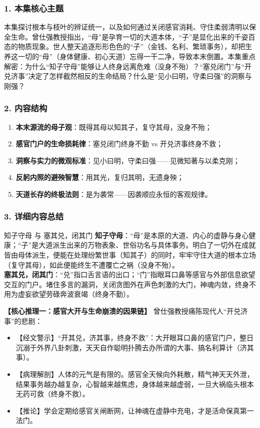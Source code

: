 \subsubsection{1. 本集核心主题}
本集探讨根本与枝叶的辨证统一，以及如何通过关闭感官消耗、守住柔弱清明以保全生命。曾仕强教授指出，“母”是孕育一切的大道本体，“子”是显化出来的千姿百态的物质现象。世人整天追逐形形色色的“子”（金钱、名利、繁琐事务），却把生养这一切的“母”（身体健康、初心天道）忘得一干二净，导致本末倒置。本集重点解密：为什么“知子守母”能够让人终身远离危难（没身不殆）？“塞兑闭门”与“开兑济事”决定了怎样截然相反的生命结局？什么是“见小曰明，守柔曰强”的洞察与刚强？

\subsubsection{2. 内容结构}
\begin{enumerate}
    \item \textbf{本末源流的母子观}：既得其母以知其子，复守其母，没身不殆；
    \item \textbf{感官门户的生命损耗律}：塞兑闭门终身不勤 vs 开兑济事终身不救；
    \item \textbf{洞察与实力的微观标准}：见小曰明，守柔曰强——见微知著与以柔克刚；
    \item \textbf{反躬内照的避殃智慧}：用其光，复归其明，无遗身殃；
    \item \textbf{天道长存的终极法则}：是为袭常——因袭顺应永恒的客观规律。
\end{enumerate}

\subsubsection{3. 详细内容总结}

\begin{ConceptBox}{知子守母 与 塞其兑，闭其门}
\textbf{知子守母}：“母”是本原的大道、内心的虚静与身心健康；“子”是大道派生出来的万物表象、世俗功名与具体事务。明白了一切外在成就皆由母体派生，便能在处理纷繁世事（知其子）的同时，牢牢守住大道的根本立场（复守其母），如此便能终生不遭覆亡之祸（没身不殆）。\\
\textbf{塞其兑，闭其门}：“兑”指口舌言语的出口；“门”指眼耳口鼻等感官与外部信息欲望交互的门户。堵住多言的漏洞，关闭贪图外在声色刺激的大门，神魂内敛，终身不用为虚妄欲望劳碌奔波衰竭（终身不勤）。
\end{ConceptBox}

\noindent\textbf{【核心推理一：感官大开与生命崩溃的因果链】}
曾仕强教授痛陈现代人“开兑济事”的悲剧：
\begin{itemize}
    \item 【经文警示】“开其兑，济其事，终身不救”：大开眼耳口鼻的感官门户，整日沉溺于外界八卦刺激，天天自作聪明扑腾去办所谓的大事、搞名利算计（济其事）。
    \item 【病理解剖】人体的元气是有限的。感官全天候向外耗散，精气神天天外泄，结果事务越办越复杂，心智越来越焦虑，身体越来越虚弱，一旦大祸临头根本无药可救（终身不救）。
    \item 【推论】学会定期给感官关闸断网，让神魂在虚静中充电，才是活命保真第一法门。
\end{itemize}

